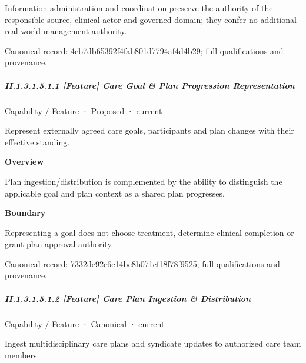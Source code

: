 Information administration and coordination preserve the authority of the responsible source, clinical actor and governed domain; they confer no additional real-world management authority.


{\footnotesize \href{../../../../continuum/strategy/capability/4cb7db65392f4fab801d7794af4d4b29.md}{Canonical record: 4cb7db65392f4fab801d7794af4d4b29}; full qualifications and provenance.}\par
\subparagraph*{II.1.3.1.5.1.1 [Feature] Care Goal \& Plan Progression Representation}
\label{navigation:II.1.3.1.5.1.1}

\label{element:7332de92e6c14bc8b071cf18f78f9525}
{\small Capability / Feature · Proposed · current}\par

Represent externally agreed care goals, participants and plan changes with their effective standing.



\textbf{Overview}



Plan ingestion/distribution is complemented by the ability to distinguish the applicable goal and plan context as a shared plan progresses.



\textbf{Boundary}



Representing a goal does not choose treatment, determine clinical completion or grant plan approval authority.


{\footnotesize \href{../../../../continuum/strategy/capability/feature/7332de92e6c14bc8b071cf18f78f9525.md}{Canonical record: 7332de92e6c14bc8b071cf18f78f9525}; full qualifications and provenance.}\par
\subparagraph*{II.1.3.1.5.1.2 [Feature] Care Plan Ingestion \& Distribution}
\label{navigation:II.1.3.1.5.1.2}

\label{element:6d4b374a6bca4b58a86c912a94bbd6b1}
{\small Capability / Feature · Canonical · current}\par

Ingest multidisciplinary care plans and syndicate updates to authorized care team members.



